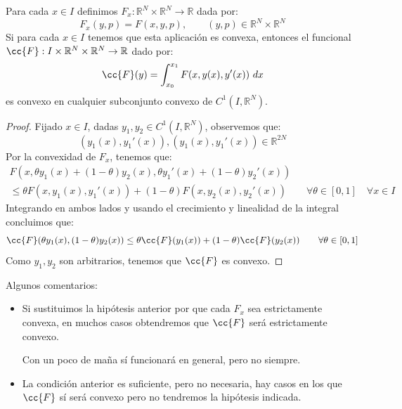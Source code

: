 \begin{lema}\label{lema:criterio_convexidad}
    Para cada $x\in I$ definimos $F_x:\mathbb{R}^N\times\mathbb{R}^N\to \mathbb{R}$ dada por:
    \begin{equation*}
        F_x(y,p) = F(x,y,p), \qquad (y,p)\in \mathbb{R}^N\times\mathbb{R}^N
    \end{equation*}
    Si para cada $x\in I$ tenemos que esta aplicación es convexa, entonces el funcional $\cc{F}:I\times\mathbb{R}^N\times \mathbb{R}^N\to \mathbb{R}$ dado por:
    \begin{equation*}
        \cc{F}(y) = \int_{x_0}^{x_1} F(x,y(x),y'(x))~dx 
    \end{equation*}
    es convexo en cualquier subconjunto convexo de $C^1(I, \mathbb{R}^N)$.
    \begin{proof}
        Fijado $x\in I$, dadas $y_1,y_2\in C^1(I,\mathbb{R}^N)$, observemos que:
        \begin{equation*}
            (y_1(x), y_1'(x)), (y_1(x), y_1'(x)) \in \mathbb{R}^{2N}
        \end{equation*}
        Por la convexidad de $F_x$, tenemos que:
        \begin{multline*}
            F(x, \theta y_1(x) + (1-\theta)y_2(x), \theta y_1'(x) + (1-\theta)y_2'(x)) \\ \leq \theta F(x,y_1(x),y_1'(x)) + (1-\theta) F(x,y_2(x),y_2'(x)) \qquad \forall \theta \in  [0,1] \quad \forall x\in I
        \end{multline*}
        Integrando en ambos lados y usando el crecimiento y linealidad de la integral concluimos que:
        \begin{equation*}
            \cc{F}(\theta y_1(x), (1-\theta)y_2(x)) \leq \theta\cc{F}(y_1(x)) + (1-\theta) \cc{F}(y_2(x)) \qquad \forall \theta \in [0,1]
        \end{equation*}
        Como $y_1,y_2$ son arbitrarios, tenemos que $\cc{F}$ es convexo.
    \end{proof}
\end{lema}

\begin{observacion}
    Algunos comentarios:
    \begin{itemize}
        \item Si sustituimos la hipótesis anterior por que cada $F_x$ sea estrictamente convexa, en muchos casos obtendremos que $\cc{F}$ será estrictamente convexo.

            Con un poco de maña sí funcionará en general, pero no siempre.
        \item La condición anterior es suficiente, pero no necesaria, hay casos en los que $\cc{F}$ sí será convexo pero no tendremos la hipótesis indicada.
    \end{itemize}
\end{observacion}

